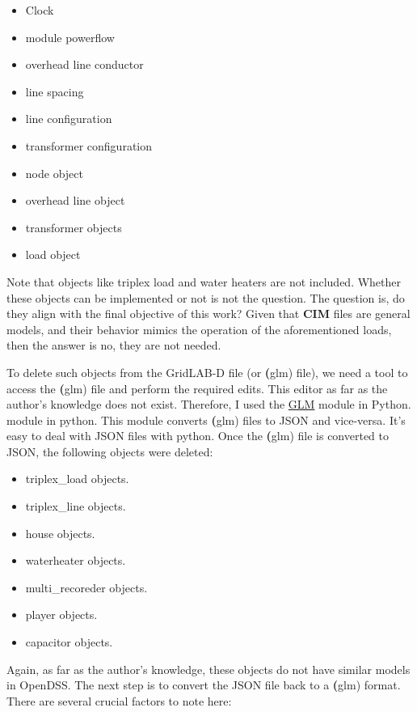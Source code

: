 \begin{itemize}
    \item Clock
    \item module powerflow
    \item overhead line conductor
    \item line spacing
    \item line configuration
    \item transformer configuration
    \item node object
    \item overhead line object
    \item transformer objects
    \item load object
\end{itemize}

Note that objects like triplex load and water heaters are not included. Whether these objects can be implemented or not is not the question. The question is, 
do they align with the final objective of this work? Given that \textbf{CIM} files are general models, and their behavior mimics the operation of the aforementioned loads,
then the answer is no, they are not needed. 

To delete such objects from the GridLAB-D file (or \textbf(glm) file), we need a tool to access the \textbf(glm) file and perform the required edits. This editor as far as 
the author's knowledge does not exist. Therefore, I used the \href{https://github.com/NREL/glm}{GLM} module in Python. module in python. This module converts \textbf(glm) files to JSON and vice-versa. It's easy to deal with 
JSON files with python. Once the \textbf(glm) file is converted to JSON, the following objects were deleted:
\begin{itemize}
    \item triplex\_load objects.
    \item triplex\_line objects.
    \item house objects.
    \item waterheater objects.
    \item multi\_recoreder objects.
    \item player objects.
    \item capacitor objects.
\end{itemize}

Again, as far as the author's knowledge, these objects do not have similar models in OpenDSS. The next step is to convert the JSON file back to a \textbf(glm) format. There are 
several crucial factors to note here:

